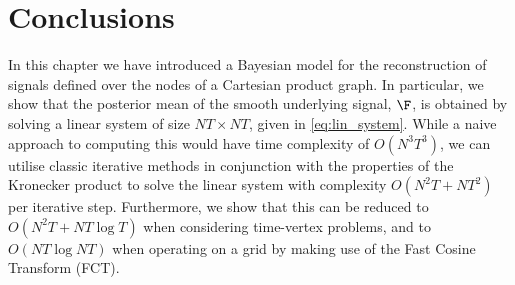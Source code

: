 









\newpage 

\section{Conclusions}

In this chapter we have introduced a Bayesian model for the reconstruction of signals defined over the nodes of a Cartesian product graph. In particular, we show that the posterior mean of the smooth underlying signal, $\F$, is obtained by solving a linear system of size $NT \times NT$, given in \cref{eq:lin_system}. While a naive approach to computing this would have time complexity of $O(N^3T^3)$, we can utilise classic iterative methods in conjunction with the properties of the Kronecker product to solve the linear system with complexity $O(N^2T + NT^2)$ per iterative step. Furthermore, we show that this can be reduced to $O(N^2T + NT \log T)$ when considering time-vertex problems, and to $O(NT \log NT)$ when operating on a grid by making use of the Fast Cosine Transform (FCT). 

